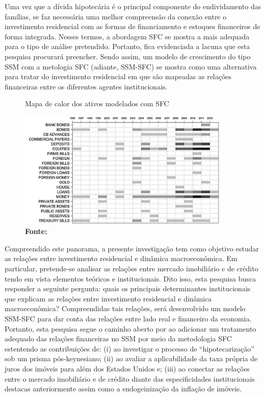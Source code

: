 Uma vez que a dívida hipotecária é o principal componente do endividamento das famílias, se faz necessária uma melhor compreensão da conexão entre o investimento residencial com as formas de financiamento e estoques financeiros de forma integrada.
Nesses termos, a abordagem SFC se mostra a mais adequada para o tipo de análise pretendido. Portanto, fica evidenciada a lacuna que esta pesquisa procurará preencher.
Sendo assim, um modelo de crescimento do tipo SSM com a metologia SFC (adiante, SSM-SFC) se mostra como uma alternativa para tratar do investimento residencial em que são mapeadas as relações financeiras entre os diferentes agentes institucionais.

\begin{figure}[htb]
	\centering
	\caption{Mapa de calor dos ativos modelados com SFC}
	\label{Heatmap}
	\includegraphics[width = 0.9\textwidth]{../../Escrita_Dissertacao/Da_Silveira_Dissertacao_Atual/Modelo/Caverzassi_Heatmap.png}
	\caption*{\textbf{Fonte:} \textcite[p.~4]{caverzasi_stock-flow_2013}}
\end{figure}




Compreendido este panorama, a presente investigação tem como objetivo estudar as relações entre investimento residencial e dinâmica macroeconômica. Em particular, pretende-se analisar as relações entre mercado imobiliário e de crédito tendo em vista elementos teóricos e institucionais. Dito isso, esta pesquisa busca responder a seguinte pergunta: quais os principais determinantes institucionais que explicam as relações entre investimento residencial e dinâmica macroeconômica? 
Compreendidas tais relações, será desenvolvido um modelo SSM-SFC para dar conta das relações entre lado real e financeiro da economia.
Portanto, esta pesquisa segue o caminho aberto por \textcite{brochier_supermultiplier_2018} ao adicionar um tratamento adequado das relações financeiras no SSM por meio da metodologia SFC estentendo as contribuições de: 
(i) \textcite{jorda_great_2014} ao investigar o processo de ``hipotecarização'' sob um prisma pós-keynesiano; 
(ii) \textcite{teixeira_crescimento_2015} ao avaliar a aplicabilidade da taxa própria de juros dos imóveis para além dos Estados Unidos e;
(iii) \textcite{da_silveira_investimento_2019} ao conectar as relações entre o mercado imobiliário e de crédito diante das especificidades institucionais destacas anteriormente assim como a endogeinização da inflação de imóveis. 